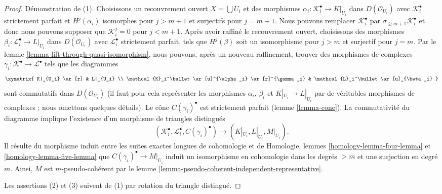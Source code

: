\begin{proof}

Démonstration de (1). Choisissons un recouvrement ouvert $X = \bigcup U_i$ et des morphismes $\alpha_i : \mathcal{K}_i^\bullet \to K|_{U_i}$ dans $D(\mathcal{O}_{U_i})$
avec $\mathcal{K}_i^\bullet$ strictement parfait et $H^j(\alpha_i)$
isomorphes pour $j > m + 1$ et surjectifs pour $j = m + 1$. Nous pouvons remplacer $\mathcal{K}_i^\bullet$ par
$\sigma_{\geq m + 1}\mathcal{K}_i^\bullet$
et donc nous pouvons supposer que $\mathcal{K}_i^j = 0$
pour $j < m + 1$. Après avoir raffiné le recouvrement ouvert, choisissons des morphismes $\beta_i : \mathcal{L}_i^\bullet \to L|_{U_i}$ dans $D(\mathcal{O}_{U_i})$
avec $\mathcal{L}_i^\bullet$ strictement parfait, tels que
$H^j(\beta)$ soit un isomorphisme pour $j > m$ et surjectif pour $j = m$. Par le lemme \ref{lemma-lift-through-quasi-isomorphism},
nous pouvons, après un nouveau raffinement, trouver des morphismes de complexes
$\gamma_i : \mathcal{K}^\bullet \to \mathcal{L}^\bullet$
tels que les diagrammes
$$
\xymatrix{
K|_{U_i} \ar[r] & L|_{U_i} \\
\mathcal{K}_i^\bullet \ar[u]^{\alpha_i} \ar[r]^{\gamma_i} &
\mathcal{L}_i^\bullet \ar[u]_{\beta_i}
}
$$
sont commutatifs dans $D(\mathcal{O}_{U_i})$ (il faut pour cela représenter les morphismes $\alpha_i$, $\beta_i$ et $K|_{U_i} \to L|_{U_i}$
par de véritables morphismes de complexes ; nous omettons quelques détails). Le cône $C(\gamma_i)^\bullet$ est strictement parfait (lemme \ref{lemma-cone}). La commutativité du diagramme implique l'existence d'un morphisme de triangles distingués
$$
(\mathcal{K}_i^\bullet, \mathcal{L}_i^\bullet, C(\gamma_i)^\bullet)
\longrightarrow
(K|_{U_i}, L|_{U_i}, M|_{U_i}).
$$
Il résulte du morphisme induit entre les suites exactes longues de cohomologie et de Homologie, lemmes \ref{homology-lemma-four-lemma} et
\ref{homology-lemma-five-lemma}
que $C(\gamma_i)^\bullet \to M|_{U_i}$ induit un isomorphisme en cohomologie dans les degrés $> m$ et une surjection en degré $m$. Ainsi, $M$ est $m$-pseudo-cohérent par le lemme \ref{lemma-pseudo-coherent-independent-representative}.

\medskip\noindent

Les assertions (2) et (3) suivent de (1) par rotation du triangle distingué.

\end{proof}

